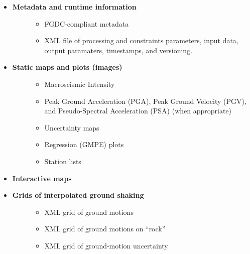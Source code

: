 \documentclass[letterpaper,10pt,english]{sphinxmanual}
\begin{document}
\begin{itemize}
\item {} \begin{description}
\item[{\textbf{Metadata and runtime information}}] \leavevmode\begin{itemize}
\item {} 
FGDC-compliant metadata

\item {} 
XML file of processing and constraints parameters, input data, output paramaters, timestamps, and versioning.

\end{itemize}

\end{description}

\item {} \begin{description}
\item[{\textbf{Static maps and plots (images)}}] \leavevmode\begin{itemize}
\item {} 
Macroseismic Intensity

\item {} 
Peak Ground Acceleration (PGA), Peak Ground Velocity (PGV), and Pseudo-Spectral Acceleration (PSA) (when appropriate)

\item {} 
Uncertainty maps

\item {} 
Regression (GMPE) plots

\item {} 
Station lists

\end{itemize}

\end{description}

\item {} 
\textbf{Interactive maps}

\item {} \begin{description}
\item[{\textbf{Grids of interpolated ground shaking}}] \leavevmode\begin{itemize}
\item {} 
XML grid of ground motions

\item {} 
XML grid of ground motions on “rock”

\item {} 
XML grid of ground-motion uncertainty


\end{itemize}
\end{description}
\end{itemize}
\end{document}
